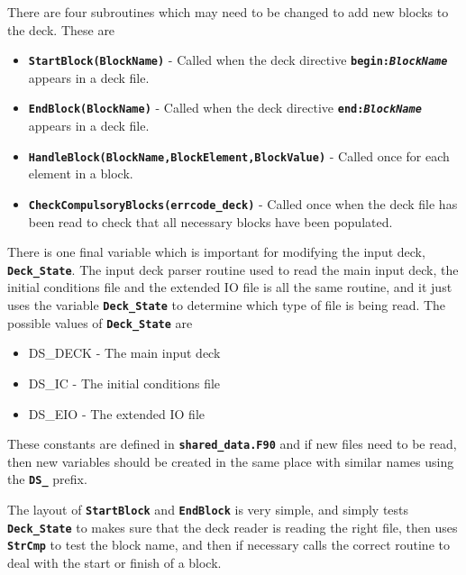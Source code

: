 \documentclass[12pt]{article}
\newcommand{\inlinecode}[1]{{\color{warwickred} \bf\texttt{#1}}}
\begin{document}
There are four subroutines which may need to be changed to add new blocks to
the deck. These are
\begin{itemize}
\item \inlinecode{StartBlock(BlockName)} - Called when the deck directive
  \inlinecode{begin:{\it BlockName}} appears in a deck file.
\item \inlinecode{EndBlock(BlockName)} - Called when the deck directive
  \inlinecode{end:{\it BlockName}} appears in a deck file.
\item \inlinecode{HandleBlock(BlockName,BlockElement,BlockValue)} - Called once
  for each element in a block.
\item \inlinecode{CheckCompulsoryBlocks(errcode\_deck)} - Called once when the
  deck file has been read to check that all necessary blocks have been
  populated.
\end{itemize}

There is one final variable which is important for modifying the input deck,
\inlinecode{Deck\_State}. The input deck parser routine used to read the main
input deck, the initial conditions file and the extended IO file is all the
same routine, and it just uses the variable \inlinecode{Deck\_State} to
determine which type of file is being read. The possible values of
\inlinecode{Deck\_State} are

\begin{itemize}
\item DS\_DECK - The main input deck
\item DS\_IC - The initial conditions file
\item DS\_EIO - The extended IO file
\end{itemize}
These constants are defined in \inlinecode{shared\_data.F90} and if new files
need to be read, then new variables should be created in the same place with
similar names using the \inlinecode{DS\_} prefix.

The layout of \inlinecode{StartBlock} and \inlinecode{EndBlock} is very simple,
and simply tests \inlinecode{Deck\_State} to makes sure that the deck reader is
reading the right file, then uses \inlinecode{StrCmp} to test the block name,
and then if necessary calls the correct routine to deal with the start or
finish of a block.
\end{document}

